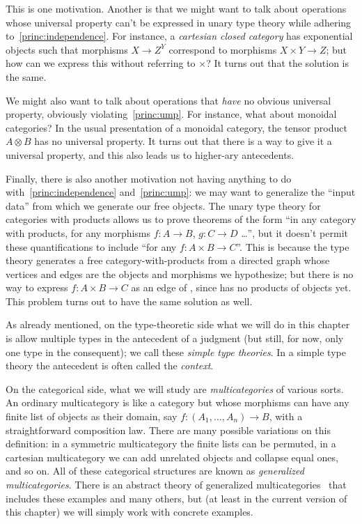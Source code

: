 \documentclass{book}
\begin{document}
This is one motivation.
Another is that we might want to talk about operations whose universal property can't be expressed in unary type theory while adhering to~\eqref{princ:independence}.
For instance, a \emph{cartesian closed category} has exponential objects such that morphisms $X\to Z^Y$ correspond to morphisms $X\times Y\to Z$; but how can we express this without referring to $\times$?
It turns out that the solution is the same.

We might also want to talk about operations that \emph{have} no obvious universal property, obviously violating~\eqref{princ:ump}.
For instance, what about monoidal categories?
In the usual presentation of a monoidal category, the tensor product $A\otimes B$ has no universal property.
It turns out that there is a way to give it a universal property, and this also leads us to higher-ary antecedents.

Finally, there is also another motivation not having anything to do with~\eqref{princ:independence} and~\eqref{princ:ump}: we may want to generalize the ``input data'' \cG from which we generate our free objects.
The unary type theory for categories with products allows us to prove theorems of the form ``in any category with products, for any morphisms $f:A\to B$, $g:C\to D$ \dots'', but it doesn't permit these quantifications to include ``for any $f:A\times B\to C$''.
This is because the type theory generates a free category-with-products from a directed graph \cG whose vertices and edges are the objects and morphisms we hypothesize; but there is no way to express $f:A\times B\to C$ as an edge of \cG, since \cG has no products of objects yet.
This problem turns out to have the same solution as well.

As already mentioned, on the type-theoretic side what we will do in this chapter is allow multiple types in the antecedent of a judgment (but still, for now, only one type in the consequent); we call these \emph{simple type theories}.
In a simple type theory the antecedent is often called the \emph{context}.

On the categorical side, what we will study are \emph{multicategories} of various sorts.
An ordinary multicategory is like a category but whose morphisms can have any finite list of objects as their domain, say $f:(A_1,\dots,A_n) \to B$, with a straightforward composition law.
There are many possible variations on this definition: in a symmetric multicategory the finite lists can be permuted, in a cartesian multicategory we can add unrelated objects and collapse equal ones, and so on.
All of these categorical structures are known as \emph{generalized multicategories}.
There is an abstract theory of generalized multicategories~\cite{cs:multicats,hermida:coh-univ,leinster:higher-opds,burroni:t-cats} that includes these examples and many others, but (at least in the current version of this chapter) we will simply work with concrete examples.
\end{document}
